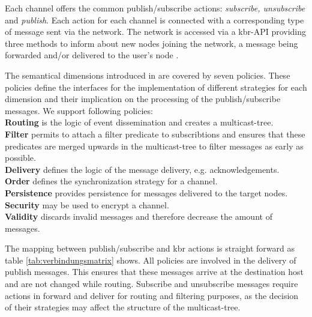 Each channel offers the common publish/subscribe actions: \emph{subscribe, unsubscribe} and \emph{publish}. Each action for each channel is connected with a corresponding type of message sent via the network. The network is accessed via a \ac{kbr}-API providing three methods to inform about new nodes joining the network, a message being forwarded and/or delivered to the user's node \cite{Dabek2003Towards}.

The semantical dimensions introduced in \cite{Fischer2010a} are covered by seven policies. These policies define the interfaces for the implementation of different strategies for each dimension and their implication on the processing of the publish/subscribe messages. We support following policies:
\\\textbf{Routing} is the logic of event dissemination and creates a multicast-tree. 
\\\textbf{Filter} permits to attach a filter predicate to subscribtions and ensures that these predicates are merged upwards in the multicast-tree to filter messages as early as possible.
\\\textbf{Delivery} defines the logic of the message delivery, e.g. acknowledgements.
\\\textbf{Order} defines the synchronization strategy for a channel.
\\\textbf{Persistence} provides persistence for messages delivered to the target nodes.
\\\textbf{Security} may be used to encrypt a channel.
\\\textbf{Validity} discards invalid messages and therefore decrease the amount of messages.

The mapping between publish/subscribe and \ac{kbr} actions is straight forward as table \ref{tab:verbindungsmatrix} shows. All policies are involved in the delivery of publish messages. This ensures that these messages arrive at the destination host and are not changed while routing. Subscribe and unsubscribe messages require actions in forward and deliver for routing and filtering purposes, as the decision of their strategies may affect the structure of the multicast-tree.

\begin{table}[!h]
\caption{Verbindungsmatrix}
\label{tab:verbindungsmatrix}
\end{table}


